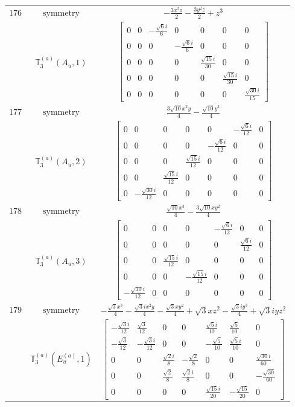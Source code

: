 \documentclass[fleqn,8pt,landscape]{jsarticle}
\begin{document}
\begin{longtable}{ccc}
$ 176 $ & $ \text{symmetry} $ & $ - \frac{3 x^{2} z}{2} - \frac{3 y^{2} z}{2} + z^{3} $ \\
$  $ & $ \mathbb{T}_{3}^{(a)}(A_{u},1) $ & $ \begin{bmatrix} 0 & 0 & - \frac{\sqrt{6} i}{6} & 0 & 0 & 0 & 0 \\ 0 & 0 & 0 & - \frac{\sqrt{6} i}{6} & 0 & 0 & 0 \\ 0 & 0 & 0 & 0 & \frac{\sqrt{15} i}{30} & 0 & 0 \\ 0 & 0 & 0 & 0 & 0 & \frac{\sqrt{15} i}{30} & 0 \\ 0 & 0 & 0 & 0 & 0 & 0 & \frac{\sqrt{30} i}{15} \end{bmatrix} $ \\ \hline
$ 177 $ & $ \text{symmetry} $ & $ \frac{3 \sqrt{10} x^{2} y}{4} - \frac{\sqrt{10} y^{3}}{4} $ \\
$  $ & $ \mathbb{T}_{3}^{(a)}(A_{u},2) $ & $ \begin{bmatrix} 0 & 0 & 0 & 0 & 0 & - \frac{\sqrt{6} i}{12} & 0 \\ 0 & 0 & 0 & 0 & - \frac{\sqrt{6} i}{12} & 0 & 0 \\ 0 & 0 & 0 & \frac{\sqrt{15} i}{12} & 0 & 0 & 0 \\ 0 & 0 & \frac{\sqrt{15} i}{12} & 0 & 0 & 0 & 0 \\ 0 & - \frac{\sqrt{30} i}{12} & 0 & 0 & 0 & 0 & 0 \end{bmatrix} $ \\ \hline
$ 178 $ & $ \text{symmetry} $ & $ \frac{\sqrt{10} x^{3}}{4} - \frac{3 \sqrt{10} x y^{2}}{4} $ \\
$  $ & $ \mathbb{T}_{3}^{(a)}(A_{u},3) $ & $ \begin{bmatrix} 0 & 0 & 0 & 0 & - \frac{\sqrt{6} i}{12} & 0 & 0 \\ 0 & 0 & 0 & 0 & 0 & \frac{\sqrt{6} i}{12} & 0 \\ 0 & 0 & \frac{\sqrt{15} i}{12} & 0 & 0 & 0 & 0 \\ 0 & 0 & 0 & - \frac{\sqrt{15} i}{12} & 0 & 0 & 0 \\ - \frac{\sqrt{30} i}{12} & 0 & 0 & 0 & 0 & 0 & 0 \end{bmatrix} $ \\ \hline
$ 179 $ & $ \text{symmetry} $ & $ - \frac{\sqrt{3} x^{3}}{4} - \frac{\sqrt{3} i x^{2} y}{4} - \frac{\sqrt{3} x y^{2}}{4} + \sqrt{3} x z^{2} - \frac{\sqrt{3} i y^{3}}{4} + \sqrt{3} i y z^{2} $ \\
$  $ & $ \mathbb{T}_{3}^{(a)}(E_{u}^{(a)},1) $ & $ \begin{bmatrix} - \frac{\sqrt{3} i}{12} & \frac{\sqrt{3}}{12} & 0 & 0 & \frac{\sqrt{5} i}{10} & \frac{\sqrt{5}}{10} & 0 \\ - \frac{\sqrt{3}}{12} & - \frac{\sqrt{3} i}{12} & 0 & 0 & - \frac{\sqrt{5}}{10} & \frac{\sqrt{5} i}{10} & 0 \\ 0 & 0 & \frac{\sqrt{2} i}{8} & - \frac{\sqrt{2}}{8} & 0 & 0 & \frac{\sqrt{30} i}{60} \\ 0 & 0 & \frac{\sqrt{2}}{8} & \frac{\sqrt{2} i}{8} & 0 & 0 & - \frac{\sqrt{30}}{60} \\ 0 & 0 & 0 & 0 & \frac{\sqrt{15} i}{20} & - \frac{\sqrt{15}}{20} & 0 \end{bmatrix} $ \\ \hline

\end{longtable}
\end{document}
